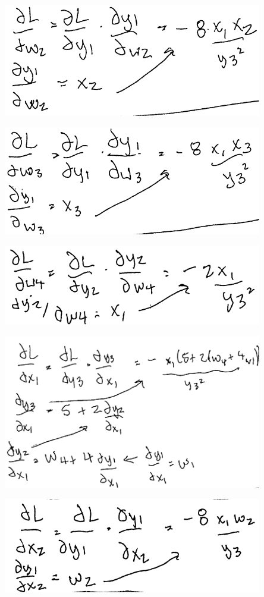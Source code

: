 \documentclass[12pt]{article}
\begin{document}
\begin{enumerate}
\begin{enumerate}
                    \includegraphics[width=0.85\textwidth]{assets/test1/dcalc3.png}

                    \includegraphics[width=0.85\textwidth]{assets/test1/dcalc4.png}

                    \includegraphics[width=0.85\textwidth]{assets/test1/dcalc5.png}

                    \includegraphics[width=0.85\textwidth]{assets/test1/dcalc6.png}

                    \includegraphics[width=0.85\textwidth]{assets/test1/dcalc7.png}


\end{enumerate}
\end{enumerate}
\end{document}
